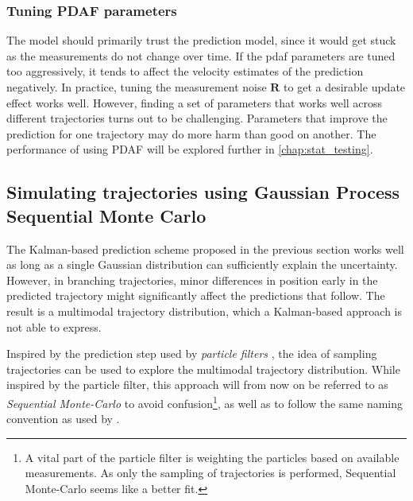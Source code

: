 \subsubsection{Tuning PDAF parameters}
The model should primarily trust the prediction model, since it would get stuck as the measurements do not change over time. If the \acrshort{pdaf} parameters are tuned too aggressively, it tends to affect the velocity estimates of the prediction negatively. In practice, tuning the measurement noise $\boldsymbol{R}$ to get a desirable update effect works well.
However, finding a set of parameters that works well across different trajectories turns out to be challenging. Parameters that improve the prediction for one trajectory may do more harm than good on another. The performance of using PDAF will be explored further in \cref{chap:stat_testing}.


\subsection{Simulating trajectories using Gaussian Process Sequential Monte Carlo}\label{sec:dyngp_particle}
The Kalman-based prediction scheme proposed in the previous section works well as long as a single Gaussian distribution can sufficiently explain the uncertainty. However, in branching trajectories, minor differences in position early in the predicted trajectory might significantly affect the predictions that follow. The result is a multimodal trajectory distribution, which a Kalman-based approach is not able to express.

Inspired by the prediction step used by \textit{particle filters} \cite{sensorfusjon}, the idea of sampling trajectories can be used to explore the multimodal trajectory distribution. While inspired by the particle filter, this approach will from now on be referred to as \textit{Sequential Monte-Carlo} to avoid confusion\footnote{A vital part of the particle filter is weighting the particles based on available measurements. As only the sampling of trajectories is performed, Sequential Monte-Carlo seems like a better fit.}, as well as to follow the same naming convention as used by \citeauthor{pedestrian} \cite{pedestrian}.

